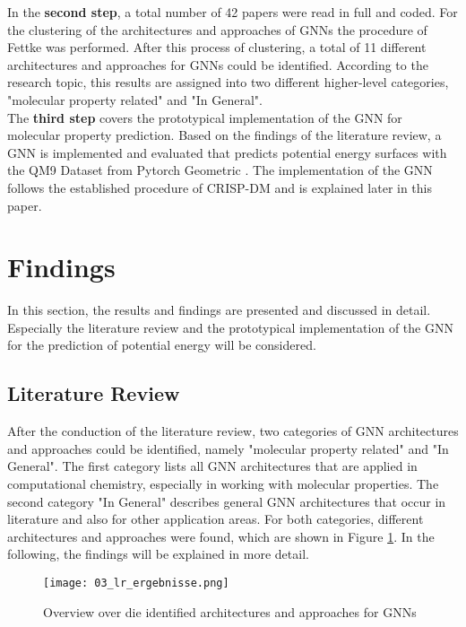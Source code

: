 In the \textbf{second step}, a total number of 42 papers were read in full and coded. For the clustering of the architectures and approaches of GNNs the procedure of Fettke \cite{fettke_state---art_2006} was performed. After this process of clustering, a total of 11 different architectures and approaches for GNNs could be identified. According to the research topic, this results are assigned into two different higher-level categories, "molecular property related" and "In General". \\

The \textbf{third step} covers the prototypical implementation of the GNN for molecular property prediction. Based on the findings of the literature review, a GNN is implemented and evaluated that predicts potential energy surfaces with the QM9 Dataset from Pytorch Geometric \cite{noauthor_torch_geometricdatasetsqm9_nodate}. The implementation of the GNN follows the established procedure of CRISP-DM \cite{wirth2000crisp} and is explained later in this paper. 

\section{Findings}
In this section, the results and findings are presented and discussed in detail. Especially the literature review and the prototypical implementation of the GNN for the prediction of potential energy will be considered. 


\subsection{Literature Review}

After the conduction of the literature review, two categories of GNN architectures and approaches could be identified, namely "molecular property related" and "In General". The first category lists all GNN architectures that are applied in computational chemistry, especially in working with molecular properties. The second category "In General"  describes general GNN architectures that occur in literature and also for other application areas. For both categories, different architectures and approaches were found, which are shown in Figure \ref{img:paper01findings}. In the following, the findings will be explained in more detail.

\begin{figure}[h]
    \centering
    \texttt{[image: 03\_lr\_ergebnisse.png]}
    \caption[Overview over die identified architectures and approaches for GNNs]{\label{img:paper01findings}{Overview over die identified architectures and approaches for GNNs}}
\end{figure} 

